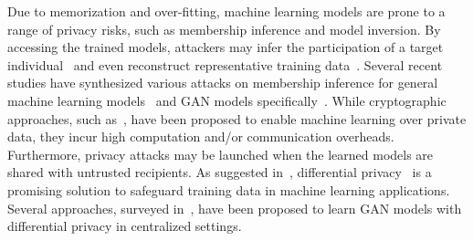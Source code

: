 \documentclass[conference]{IEEEtran}
\begin{document}

Due to memorization and over-fitting, machine learning models are prone to a range of privacy risks, such as membership inference and model inversion. By accessing the trained models, attackers may infer the participation of a target individual~\cite{ShokriMemML2016} and even reconstruct representative training data~\cite{MIAttack2015}. Several recent studies have synthesized various attacks on membership inference for general machine learning models~\cite{MemAttackYeom2018} and GAN models specifically~\cite{ChenGANLeaks_2020}.  While cryptographic approaches, such as~\cite{BonawitzCrypto2017, PhongHomo2018}, have been proposed to enable machine learning over private data, they incur high computation and/or communication overheads. Furthermore, privacy attacks may be launched when the learned models are shared with untrusted recipients. As suggested in~\cite{ShokriMemML2016}, differential privacy~\cite{dwork_book,DPSGD2016Abadi} is a promising solution to safeguard training data in machine learning applications.  Several approaches, surveyed in~\cite{fan2020survey}, have been proposed to learn GAN models with differential privacy in centralized settings.  
\end{document}
